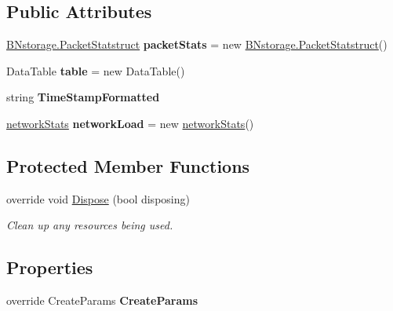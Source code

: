 \subsection*{Public Attributes}
\begin{DoxyCompactItemize}
\item 
\mbox{\label{class_b_n_a30_1_1_form1_a8305003bd606771921a38189627e608e}} 
\mbox{\hyperlink{struct_b_n_a30_1_1_b_nstorage_1_1_packet_statstruct}{B\+Nstorage.\+Packet\+Statstruct}} {\bfseries packet\+Stats} = new \mbox{\hyperlink{struct_b_n_a30_1_1_b_nstorage_1_1_packet_statstruct}{B\+Nstorage.\+Packet\+Statstruct}}()
\item 
\mbox{\label{class_b_n_a30_1_1_form1_ad2699e938533aa0e018bc269c9812a54}} 
Data\+Table {\bfseries table} = new Data\+Table()
\item 
\mbox{\label{class_b_n_a30_1_1_form1_ad35d8a0026aaa6774ac161f3cd0fe306}} 
string {\bfseries Time\+Stamp\+Formatted}
\item 
\mbox{\label{class_b_n_a30_1_1_form1_a2d74744d2973a165d57ae07120c0d2fa}} 
\mbox{\hyperlink{struct_b_n_a30_1_1_form1_1_1network_stats}{network\+Stats}} {\bfseries network\+Load} = new \mbox{\hyperlink{struct_b_n_a30_1_1_form1_1_1network_stats}{network\+Stats}}()
\end{DoxyCompactItemize}
\subsection*{Protected Member Functions}
\begin{DoxyCompactItemize}
\item 
override void \mbox{\hyperlink{class_b_n_a30_1_1_form1_a3119d1007891ede1ab3020be53626fe9}{Dispose}} (bool disposing)
\begin{DoxyCompactList}\small\item\em Clean up any resources being used. \end{DoxyCompactList}\end{DoxyCompactItemize}
\subsection*{Properties}
\begin{DoxyCompactItemize}
\item 
\mbox{\label{class_b_n_a30_1_1_form1_a31230b91763823de9c87596bbac2f555}} 
override Create\+Params {\bfseries Create\+Params}
\end{DoxyCompactItemize}


